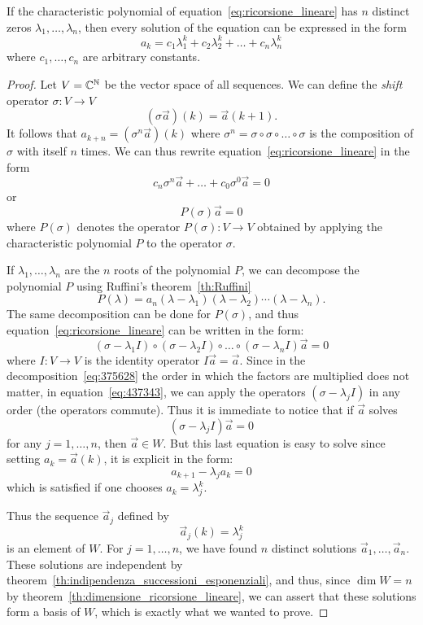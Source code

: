 \begin{theorem}
If the characteristic polynomial of equation~\eqref{eq:ricorsione_lineare}
has $n$ distinct zeros $\lambda_1, \dots, \lambda_n$,
then
every solution of the equation can be expressed in the form
\[
  a_k = c_1 \lambda_1^k + c_2 \lambda_2^k + \dots + c_n \lambda_n^k
\]
where $c_1, \dots, c_n$ are arbitrary constants.
\end{theorem}
%
\begin{proof}
Let $V={\mathbb C}^{\mathbb N}$ be the vector space of all sequences.
We can define the \emph{shift} operator $\sigma\colon V\to V$
\[
  (\sigma \vec a)(k) = \vec a(k+1).
\]
It follows that $a_{k+n} = (\sigma^n \vec a)(k)$ where
$\sigma^n = \sigma \circ \sigma \circ \dots \circ \sigma$
is the composition of $\sigma$ with itself $n$ times.
We can thus rewrite equation~\eqref{eq:ricorsione_lineare} in the form
\[
  c_n \sigma^n \vec a + \dots + c_0 \sigma^0 \vec a = 0
\]
or
\[
  P(\sigma)\vec a = 0
\]
where $P(\sigma)$ denotes the operator $P(\sigma)\colon V\to V$
obtained by applying the characteristic polynomial $P$ to the operator $\sigma$.

If $\lambda_1,\dots,\lambda_n$ are the $n$ roots of the polynomial $P$, we can
decompose the polynomial $P$ using Ruffini's theorem~\ref{th:Ruffini}
\begin{equation}\label{eq:375628}
  P(\lambda)
  = a_n (\lambda -\lambda_1)(\lambda- \lambda_2)\cdots (\lambda - \lambda_n).
\end{equation}
The same decomposition can be done for $P(\sigma)$,
and thus equation~\eqref{eq:ricorsione_lineare}
can be written in the form:
\begin{equation}\label{eq:437343}
(\sigma - \lambda_1 I)\circ (\sigma-\lambda_2 I)\circ \dots \circ (\sigma
-\lambda_n I) \vec a = 0
\end{equation}
where $I\colon V\to V$ is the identity operator $I\vec a = \vec a$.
Since in the decomposition~\eqref{eq:375628}
the order in which the factors are multiplied does not matter,
in equation~\eqref{eq:437343}, we can apply the operators
$(\sigma -\lambda_j I)$ in any order (the operators commute).
Thus it is immediate to notice that if $\vec a$ solves
\[
  (\sigma - \lambda_j I) \vec a = 0
\]
for any $j=1,\dots, n$, then $\vec a\in W$.
But this last equation is easy to solve since
setting $a_k = \vec a(k)$, it is explicit in the form:
\[
  a_{k+1} - \lambda_j a_k = 0
\]
which is satisfied if
one chooses $a_k = \lambda_j^k$.

Thus the sequence $\vec a_j$ defined by
\[
  \vec a_j(k) = \lambda_j^k
\]
is an element of $W$.
For $j=1,\dots, n$, we have found $n$ distinct solutions
$\vec a_1, \dots, \vec a_n$. These solutions are
independent by theorem~\ref{th:indipendenza_successioni_esponenziali},
and thus, since $\dim W = n$ by theorem~\ref{th:dimensione_ricorsione_lineare},
we can assert that these solutions form a basis of $W$,
which is exactly what we wanted to prove.
\end{proof}

